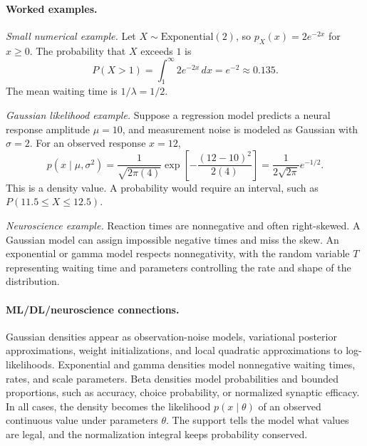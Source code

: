 \paragraph{Worked examples.}
\emph{Small numerical example.} Let \(X\sim\mathrm{Exponential}(2)\), so \(p_X(x)=2e^{-2x}\) for \(x\geq0\). The probability that \(X\) exceeds \(1\) is
\[
P(X>1)=\int_1^\infty 2e^{-2x}\,dx=e^{-2}\approx0.135.
\]
The mean waiting time is \(1/\lambda=1/2\).

\emph{Gaussian likelihood example.} Suppose a regression model predicts a neural response amplitude \(\mu=10\), and measurement noise is modeled as Gaussian with \(\sigma=2\). For an observed response \(x=12\),
\[
p(x\mid\mu,\sigma^2)
=\frac{1}{\sqrt{2\pi(4)}}\exp\!\left[-\frac{(12-10)^2}{2(4)}\right]
=\frac{1}{2\sqrt{2\pi}}e^{-1/2}.
\]
This is a density value. A probability would require an interval, such as \(P(11.5\leq X\leq12.5)\).

\emph{Neuroscience example.} Reaction times are nonnegative and often right-skewed. A Gaussian model can assign impossible negative times and miss the skew. An exponential or gamma model respects nonnegativity, with the random variable \(T\) representing waiting time and parameters controlling the rate and shape of the distribution.

\paragraph{ML/DL/neuroscience connections.}
Gaussian densities appear as observation-noise models, variational posterior approximations, weight initializations, and local quadratic approximations to log-likelihoods. Exponential and gamma densities model nonnegative waiting times, rates, and scale parameters. Beta densities model probabilities and bounded proportions, such as accuracy, choice probability, or normalized synaptic efficacy. In all cases, the density becomes the likelihood \(p(x\mid\theta)\) of an observed continuous value under parameters \(\theta\). The support tells the model what values are legal, and the normalization integral keeps probability conserved.

